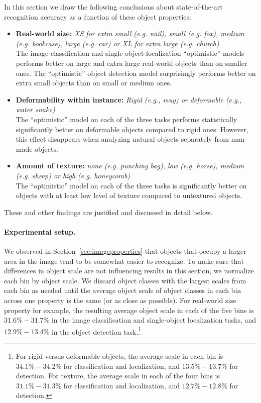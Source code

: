 In this section we draw the following  conclusions about state-of-the-art recognition accuracy as a function of these object properties:
\begin{itemize}
\item {\bf Real-world size:}  \emph{XS for extra small (e.g. nail), small (e.g. fox), medium (e.g. bookcase), large (e.g. car) or XL for extra large (e.g. church)} \\
The image classification and single-object localization ``optimistic'' models performs better on large and extra large real-world objects than on smaller ones. The ``optimistic'' object detection model surprisingly performs better on extra small objects than on small or medium ones.
\item {\bf Deformability within instance:} \emph{Rigid (e.g., mug) or deformable (e.g., water snake)}\\
The ``optimistic'' model on each of the three tasks performs statistically significantly better on deformable objects compared to rigid ones. However, this effect disappears when analyzing natural objects separately from man-made objects.
\item {\bf Amount of texture:} \emph{none (e.g. punching bag),  low (e.g. horse), medium (e.g. sheep) or high (e.g. honeycomb)}\\
The ``optimistic'' model on each of the three tasks is significantly better on objects with at least low level of texture compared to  untextured objects.
\end{itemize} 
These and other findings are justified and discussed in detail below.




\paragraph{Experimental setup.}
We observed in Section~\ref{sec:imageproperties} that objects that occupy a larger area in the image tend to be somewhat easier to recognize. To make sure that differences in object scale are not influencing results in this section, we normalize each bin by object scale. We discard object classes with the largest scales from each bin as needed until the average object scale of  object classes in each bin across one property is the same (or as close as possible). For real-world size property for example, the resulting average object scale in each of the five bins is $31.6\%-31.7\%$ in the image classification and single-object localization tasks, and $12.9\%-13.4\%$ in the object detection task.\footnote{For rigid versus deformable objects, the average scale in each bin is $34.1\%-34.2\%$ for classification and localization, and $13.5\%-13.7\%$ for detection. For texture, the average scale in each of the four bins is $31.1\%-31.3\%$ for classification and localization, and $12.7\%-12.8\%$ for detection.}

